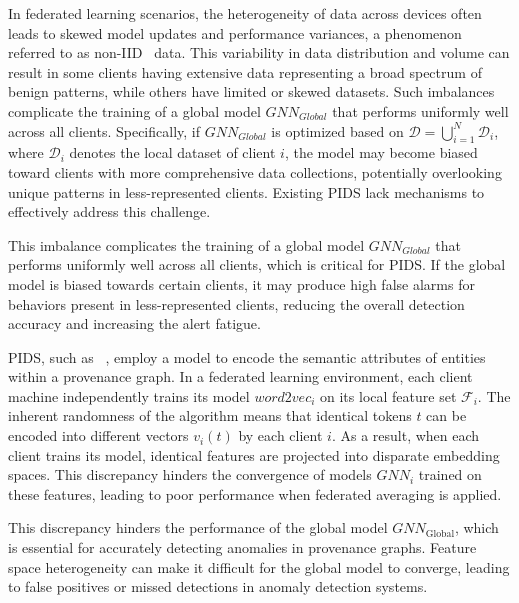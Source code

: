  In federated learning scenarios, the heterogeneity of data across devices often leads to skewed model updates and performance variances, a phenomenon referred to as non-IID~\cite{zhao2018federated} data. This variability in data distribution and volume can result in some clients having extensive data representing a broad spectrum of benign patterns, while others have limited or skewed datasets. Such imbalances complicate the training of a global model \( GNN_{Global} \) that performs uniformly well across all clients. Specifically, if \( GNN_{Global} \) is optimized based on $\mathcal{D} = \bigcup_{i=1}^{N} \mathcal{D}_i$, where $\mathcal{D}_i$ denotes the local dataset of client $i$, the model may become biased toward clients with more comprehensive data collections, potentially overlooking unique patterns in less-represented clients. Existing PIDS lack mechanisms to effectively address this challenge.

This imbalance complicates the training of a global model \( GNN_{Global} \) that performs uniformly well across all clients, which is critical for PIDS. If the global model is biased towards certain clients, it may produce high false alarms for behaviors present in less-represented clients, reducing the overall detection accuracy and increasing the alert fatigue.

 PIDS, such as \flash~\cite{cheng2023kairos}, employ a \wordvec model to encode the semantic attributes of entities within a provenance graph. In a federated learning environment, each client machine independently trains its \wordvec model \( word2vec_{i} \) on its local feature set $\mathcal{F}_i$. The inherent randomness of the \wordvec algorithm means that identical tokens $t$ can be encoded into different vectors $v_i(t)$ by each client $i$. As a result, when each client trains its \wordvec model, identical features are projected into disparate embedding spaces. This discrepancy hinders the convergence of \gnn models \( GNN_{i} \) trained on these features, leading to poor performance when federated averaging is applied.

This discrepancy hinders the performance of the global model \( GNN_{\text{Global}} \), which is essential for accurately detecting anomalies in provenance graphs. Feature space heterogeneity can make it difficult for the global model to converge, leading to false positives or missed detections in anomaly detection systems.

